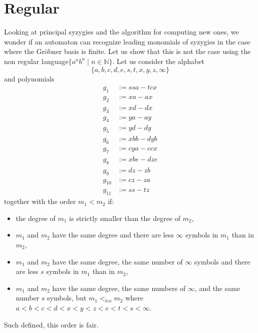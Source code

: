 \documentclass[sigconf]{acmart}
\theoremstyle{plain}
\theoremstyle{definition}
\theoremstyle{remark}
\newcommand{\N}{\mathbb{N}}
\begin{document}
\section{Regular}

Looking at principal syzygies and the algorithm for computing new ones, we wonder if an automaton can recognize leading monomials of syzygies in the case where the Gröbner basis is finite. Let us show that this is not the case using the non regular language\linebreak $\{a^nb^n \;|\; n \in \N\}$. Let us consider the alphabet 
$$\{a, b, c, d, e, s, t, x, y, z, \infty\}$$
and polynomials
\begin{align*}
g_1 & := ssa - tcx \\
g_2 & := xa - ax \\
g_3 & := xd - dx \\
g_4 & := ya - ay \\
g_5 & := yd - dy \\
g_6 & := xbb - dyb \\
g_7 & := cya - ccx \\
g_8 & := xbe - dze \\
g_9 & := dz - zb \\
g_{10} & := cz - za \\
g_{11} & := ss-tz
\end{align*}
together with the order $m_1 < m_2$ if:
\begin{itemize}
\item the degree of $m_1$ is strictly smaller than the degree of $m_2$,
\item $m_1$ and $m_2$ have the same degree and there are less $\infty$ symbols in $m_1$ than in $m_2$,
\item $m_1$ and $m_2$ have the same degree, the same number of $\infty$ symbols and there are less $s$ symbols in $m_1$ than in $m_2$,
\item $m_1$ and $m_2$ have the same degree, the same numbers of $\infty$, and the same number $s$ symbols, but
$m_1 <_{lex} m_2$ where\\ $a < b < c < d < x < y < z < e < t < s < \infty$.
\end{itemize}
Such defined, this order is fair.
\end{document}
